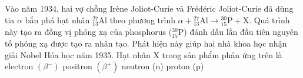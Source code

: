 	\begin{ex}%
		Vào năm 1934, hai vợ chồng Irène Joliot-Curie và Frédéric Joliot-Curie đã dùng tia $\alpha$ bắn phá hạt nhân ${}^{27}_{13}\text{Al}$ theo phương trình $\alpha+{}^{27}_{13}\text{Al}\to{}^{30}_{15}\text{P}+\text{X}$. Quá trình này tạo ra đồng vị phóng xạ của phosphorus (${}^{30}_{15}\text{P}$) đánh dấu lần đầu tiên nguyên tố phóng xạ được tạo ra nhân tạo. Phát hiện này giúp hai nhà khoa học nhận giải Nobel Hóa học năm 1935. Hạt nhân X trong sản phẩm phản ứng trên là
		\choice
		{electron $\left(\beta^-\right)$}
		{positron $\left(\beta^+\right)$}
		{\True neutron (n)}
		{proton (p)}
	\end{ex}


